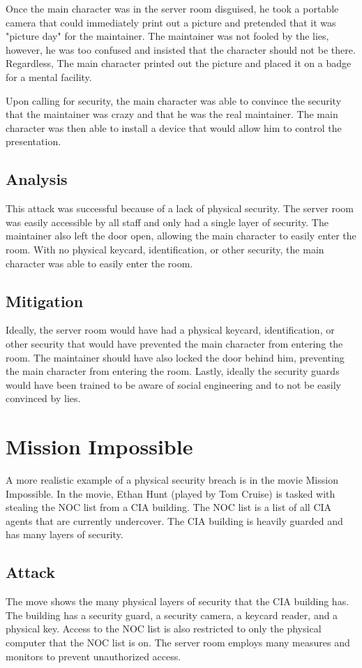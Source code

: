 \documentclass[acmsmall]{acmart}
\begin{document}
Once the main character was in the server room disguised, he took a portable camera that could
immediately print out a picture and pretended that it was "picture day" for the maintainer.
The maintainer was not fooled by the lies, however, he was too confused and insisted that the
character should not be there. Regardless, The main character printed out the picture and
placed it on a badge for a mental facility.

Upon calling for security, the main character was able to convince the security that the
maintainer was crazy and that he was the real maintainer. The main character was then able
to install a device that would allow him to control the presentation.

\subsection{Analysis}
This attack was successful because of a lack of physical security. The server room was
easily accessible by all staff and only had a single layer of security. The maintainer
also left the door open, allowing the main character to easily enter the room.
With no physical keycard, identification, or other security, the main character was
able to easily enter the room.

\subsection{Mitigation}
Ideally, the server room would have had a physical keycard, identification, or other
security that would have prevented the main character from entering the room. The
maintainer should have also locked the door behind him, preventing the main character
from entering the room. Lastly, ideally the security guards would have been trained
to be aware of social engineering and to not be easily convinced by lies.

\section{Mission Impossible \texorpdfstring{\cite{missionimpossible}}{}}
A more realistic example of a physical security breach is in the movie
Mission Impossible. In the movie, Ethan Hunt (played by Tom Cruise) is tasked
with stealing the NOC list from a CIA building. The NOC list is a list of all
CIA agents that are currently undercover. The CIA building is heavily guarded
and has many layers of security.

\subsection{Attack}
The move shows the many physical layers of security that the CIA
building has. The building has a security guard, a security camera, a keycard
reader, and a physical key. Access to the NOC list is also restricted to only
the physical computer that the NOC list is on. The server room employs many
measures and monitors to prevent unauthorized access.
\end{document}
